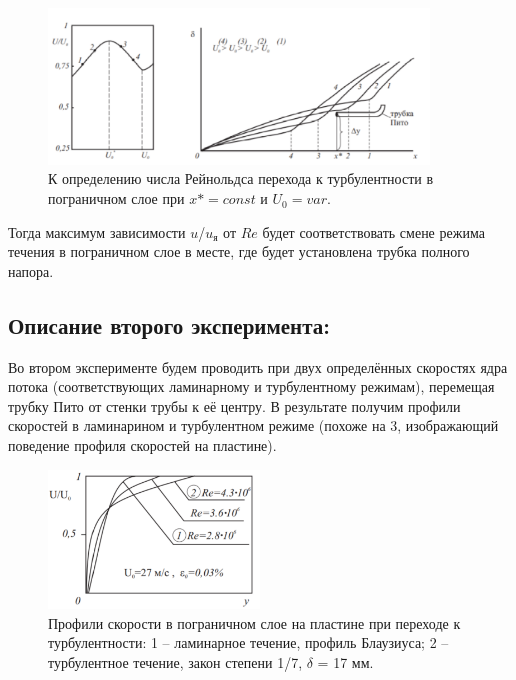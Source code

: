 \documentclass[a4paper]{article}
\begin{document}
\begin {figure}[H]
\begin{center}
\par
\includegraphics[width=0.9\textwidth]{02.png}
\caption{ К определению числа Рейнольдса перехода к турбулентности в пограничном слое при $x* = const$ и $U_0 = var$.}
\end{center}
\end {figure}

Тогда максимум зависимости $u$/$u_\text{я}$ от $Re$ будет соответствовать смене режима течения в пограничном слое
в месте, где будет установлена трубка полного напора.


\subsection*{Описание второго эксперимента:}
Во втором эксперименте будем проводить при двух определённых скоростях ядра потока (соответствующих ламинарному и турбулентному режимам), перемещая трубку Пито от стенки трубы к её центру. В результате
получим профили скоростей в ламинарином и турбулентном режиме (похоже на 3, изображающий поведение
профиля скоростей на пластине).

\begin {figure}[H]
\begin{center}
\par
\includegraphics[width=0.5\textwidth]{03.png}
\caption{ Профили скорости в пограничном слое на пластине при переходе к турбулентности: 1 – ламинарное
течение, профиль Блаузиуса; 2 – турбулентное течение, закон степени 1/7, $\delta$ = 17 мм.}
\end{center}
\end {figure}
\end{document}
